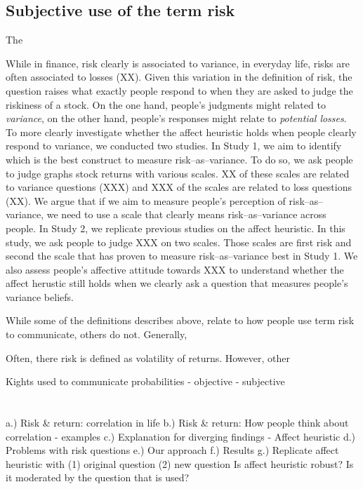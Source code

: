 \documentclass[a4paper,doc, natbib]{apa6} %
\begin{document}
\subsection{Subjective use of the term risk}
The 



%

 While in finance, risk clearly is associated to variance, in everyday life, risks are often associated to losses (XX). Given this variation in the definition of risk, the question raises what exactly people respond to when they are asked to judge the riskiness of a stock. On the one hand, people's judgments might related to \textit{variance}, on the other hand, people's responses might relate to \textit{potential losses}. To more clearly investigate whether the affect heuristic holds when people clearly respond to variance, we conducted two studies. In Study 1, we aim to identify which is the best construct to measure risk--as--variance. To do so, we ask people to judge graphs stock returns with various scales. XX of these scales are related to variance questions (XXX) and XXX of the scales are related to loss questions (XX). We argue that if we aim to measure people's perception of risk--as--variance, we need to use a scale that clearly means risk--as--variance across people. In Study 2, we replicate previous studies on the affect heuristic. In this study, we ask people to judge XXX on two scales. Those scales are first risk and second the scale that has proven to measure risk--as--variance best in Study 1. We also assess people's affective attitude towards XXX to understand whether the affect herustic still holds when we clearly ask a question that measures people's variance beliefs. 

While some of the definitions describes above, relate to how people use term risk to communicate, others do not. Generally, 

Often, there risk is defined as volatility of returns. However, other 

Kights used to communicate probabilities
- objective
- subjective

\section{}


a.)	Risk & return: correlation in life
b.)	Risk & return: How people think about correlation
-	examples
c.)	Explanation for diverging findings
-	Affect heuristic
d.)	Problems with risk questions
e.)	Our approach
f.)	Results
g.)	Replicate affect heuristic with (1) original question (2) new question
	Is affect heuristic robust?
	Is it moderated by the question that is used?
\end{document}
